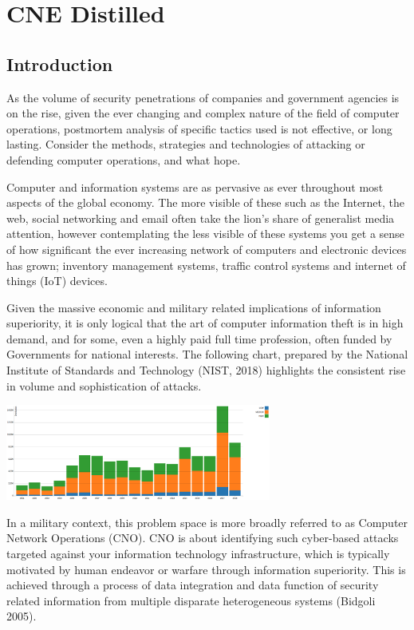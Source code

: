 \documentclass[11pt]{report}
\begin{document}
\chapter{CNE Distilled}


\section{Introduction}
As the volume of security penetrations of companies and government agencies is on the rise, given the ever changing and complex nature of the field of computer operations, postmortem analysis of specific tactics used is not effective, or long lasting.  Consider the methods, strategies and technologies of attacking or defending computer operations, and what hope.

Computer and information systems are as pervasive as ever throughout most aspects of the global economy. The more visible of these such as the Internet, the web, social networking and email often take the lion’s share of generalist media attention, however contemplating the less visible of these systems you get a sense of how significant the ever increasing network of computers and electronic devices has grown; inventory management systems, traffic control systems and internet of things (IoT) devices.

Given the massive economic and  military related implications of information superiority, it is only logical that the art of computer information theft is in high demand, and for some, even a highly paid full time profession, often funded by Governments for national interests. The following chart, prepared by the National Institute of Standards and Technology (NIST, 2018) highlights the consistent rise in volume and sophistication of attacks.

\includegraphics[width=330px]{nist.png}

\begingroup %
\endgroup

In a military context, this problem space is more broadly referred to as Computer Network Operations (CNO). CNO is about identifying such cyber-based attacks targeted against your information technology infrastructure, which is typically motivated by human endeavor or warfare through information superiority. This is achieved through a process of data integration and data function of security related information from multiple disparate heterogeneous systems (Bidgoli 2005).
\end{document}
